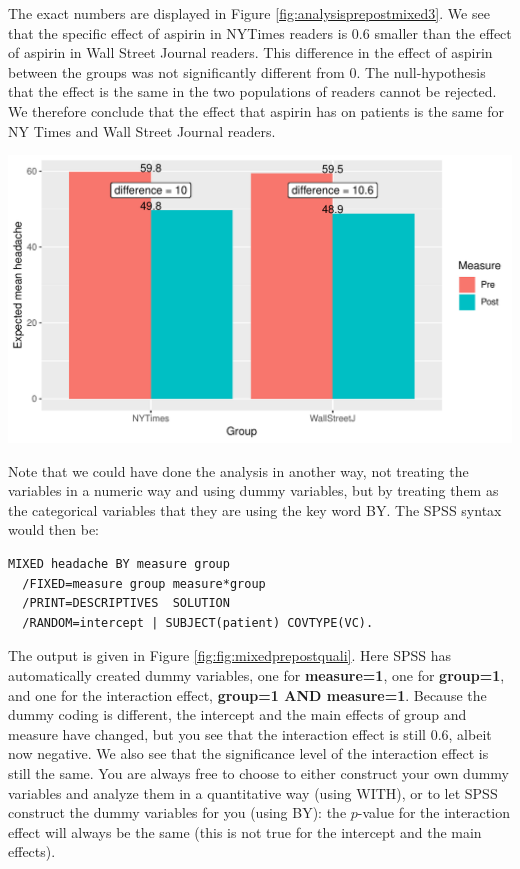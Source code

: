 \documentclass[]{report}\usepackage[]{graphicx}\usepackage[]{color}
\makeatletter
\def\maxwidth{ %
  \ifdim\Gin@nat@width>\linewidth
    \linewidth
  \else
    \Gin@nat@width
  \fi
}
\newenvironment{knitrout}{}{} %
\makeatother
\begin{document}
The exact numbers are displayed in Figure \ref{fig:analysisprepostmixed3}. We see that the specific effect of aspirin in NYTimes readers is 0.6 smaller than the effect of aspirin in Wall Street Journal readers. This difference in the effect of aspirin between the groups was not significantly different from 0. The null-hypothesis that the effect is the same in the two populations of readers cannot be rejected. We therefore conclude that the effect that aspirin has on patients is the same for NY Times and Wall Street Journal readers.

\begin{knitrout}
\color{fgcolor}

{\centering \includegraphics[width=\maxwidth]{figure/analysisprepostmixed3-1} 

}



\end{knitrout}



Note that we could have done the analysis in another way, not treating the variables in a numeric way and using dummy variables, but by treating them as the categorical variables that they are using the key word BY. The SPSS syntax would then be:

\begin{verbatim}
MIXED headache BY measure group 
  /FIXED=measure group measure*group
  /PRINT=DESCRIPTIVES  SOLUTION
  /RANDOM=intercept | SUBJECT(patient) COVTYPE(VC).
\end{verbatim}


The output is given in Figure \ref{fig:fig:mixedprepostquali}. Here SPSS has automatically created dummy variables, one for \textbf{measure=1}, one for \textbf{group=1}, and one for the interaction effect, \textbf{group=1 AND measure=1}. Because the dummy coding is different, the intercept and the main effects of group and measure have changed, but you see that the interaction effect is still 0.6, albeit now negative. We also see that the significance level of the interaction effect is still the same. You are always free to choose to either construct your own dummy variables and analyze them in a quantitative way (using WITH), or to let SPSS construct the dummy variables for you (using BY): the $p$-value for the interaction effect will always be the same (this is not true for the intercept and the main effects).
\end{document}
